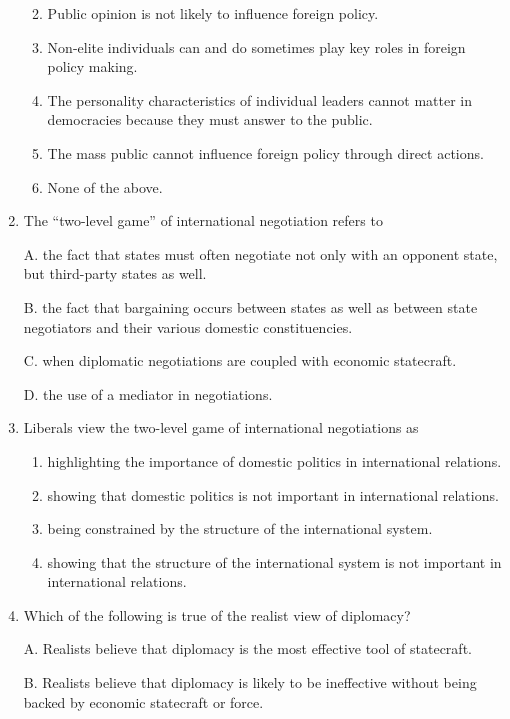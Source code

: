 \documentclass[
]{book}
\begin{document}
\begin{enumerate}
  \begin{enumerate}
  \def\labelenumii{\Alph{enumii}.}
  \item
    Public opinion is not likely to influence foreign policy.
  \item
    Non-elite individuals can and do sometimes play key roles in foreign policy making.
  \item
    The personality characteristics of individual leaders cannot matter in democracies because they must answer to the public.
  \item
    The mass public cannot influence foreign policy through direct actions.
  \item
    None of the above.
  \end{enumerate}
\item
  The ``two-level game'' of international negotiation refers to

  A. the fact that states must often negotiate not only with an opponent state, but third-party states as well.

  B. the fact that bargaining occurs between states as well as between state negotiators and their various domestic constituencies.

  C. when diplomatic negotiations are coupled with economic statecraft.

  D. the use of a mediator in negotiations.
\item
  Liberals view the two-level game of international negotiations as

  \begin{enumerate}
  \def\labelenumii{\Alph{enumii}.}
  \item
    highlighting the importance of domestic politics in international relations.
  \item
    showing that domestic politics is not important in international relations.
  \item
    being constrained by the structure of the international system.
  \item
    showing that the structure of the international system is not important in international relations.
  \end{enumerate}
\item
  Which of the following is true of the realist view of diplomacy?

  A. Realists believe that diplomacy is the most effective tool of statecraft.

  B. Realists believe that diplomacy is likely to be ineffective without being backed by economic statecraft or force.


\end{enumerate}
\end{document}
